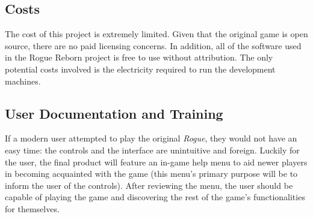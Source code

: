 \documentclass[12pt, titlepage]{article}
\begin{document}
	\subsection{Costs}

	The cost of this project is extremely limited.  Given that the original game is open source, there are no paid licensing concerns.  In addition, all of the software used in the Rogue Reborn project is free to use without attribution.  The only potential costs involved is the electricity required to run the development machines.

	\subsection{User Documentation and Training}

	If a modern user attempted to play the original \textit{Rogue}, they would not have an easy time: the controls and the interface are unintuitive and foreign.  Luckily for the user, the final product will feature an in-game help menu to aid newer players in becoming acquainted with the game (this menu's primary purpose will be to inform the user of the controls).  After reviewing the menu, the user should be capable of playing the game and discovering the rest of the game's functionalities for themselves.
\end{document}
